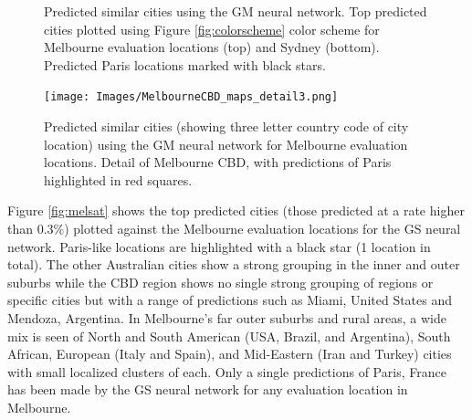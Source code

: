 \documentclass[sageh,times]{sagej}
\begin{document}
\begin{figure}[!htbp]
\caption{Predicted similar cities using the GM neural network. Top predicted cities plotted using Figure \ref{fig:colorscheme} color scheme for Melbourne evaluation locations (top) and Sydney (bottom). Predicted Paris locations marked with black stars.}    
 \label{fig:melmaps}  
\end{figure} 

\begin{figure}[!htbp]
\centering     
\texttt{[image: Images/MelbourneCBD\_maps\_detail3.png]} 
\caption{Predicted similar cities (showing three letter country code of city location) using the GM neural network for Melbourne evaluation locations. Detail of Melbourne CBD, with predictions of Paris highlighted in red squares.}    
 \label{fig:melmapscbd}  
\end{figure} 






Figure \ref{fig:melsat} shows the top predicted cities (those predicted at a rate higher than 0.3\%) plotted against the Melbourne evaluation locations for the GS neural network. Paris-like locations are highlighted with a black star (1 location in total).  The other Australian cities show a strong grouping in the inner and outer suburbs while the CBD region shows no single strong grouping of regions or specific cities but with a range of predictions such as Miami, United States and Mendoza, Argentina. In Melbourne's far outer suburbs and rural areas, a wide mix is seen of North and South American (USA, Brazil, and Argentina), South African, European (Italy and Spain), and Mid-Eastern (Iran and Turkey) cities with small localized clusters of each. Only a single predictions of Paris, France has been made by the GS neural network for any evaluation location in Melbourne.
\end{document}
